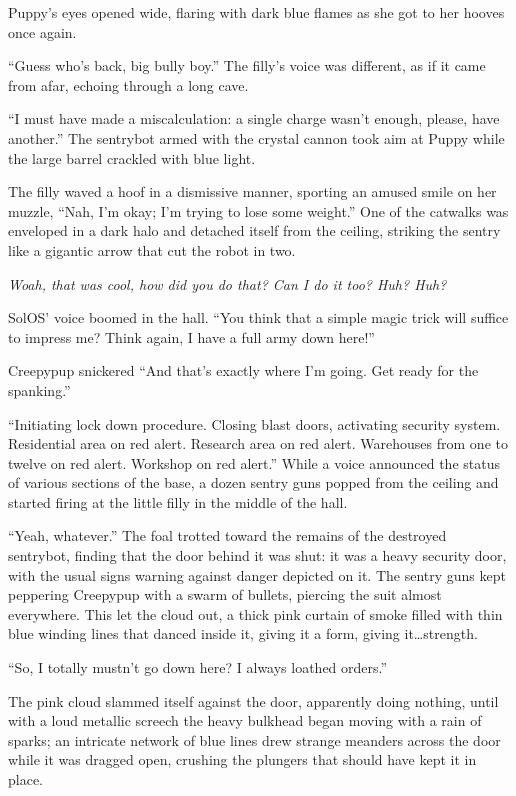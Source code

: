 
Puppy's eyes opened wide, flaring with dark blue flames as she got to her hooves once again.

``Guess who's back, big bully boy.'' The filly's voice was different, as if it came from afar, echoing through a long cave.

``I must have made a miscalculation: a single charge wasn't enough, please, have another.'' The sentrybot armed with the crystal cannon took aim at Puppy while the large barrel crackled with blue light.

The filly waved a hoof in a dismissive manner, sporting an amused smile on her muzzle, ``Nah, I'm okay; I'm trying to lose some weight.'' One of the catwalks was enveloped in a dark halo and detached itself from the ceiling, striking the sentry like a gigantic arrow that cut the robot in two.

\emph{Woah, that was cool, how did you do that? Can I do it too? Huh? Huh?}

SolOS' voice boomed in the hall. ``You think that a simple magic trick will suffice to impress me? Think again, I have a full army down here!''

Creepypup snickered ``And that's exactly where I'm going. Get ready for the spanking.''

``{\mt Initiating lock down procedure. Closing blast doors, activating security system. Residential area on red alert. Research area on red alert. Warehouses from one to twelve on red alert. Workshop on red alert.}'' While a voice announced the status of various sections of the base, a dozen sentry guns popped from the ceiling and started firing at the little filly in the middle of the hall.

``Yeah, whatever.'' The foal trotted toward the remains of the destroyed sentrybot, finding that the door behind it was shut: it was a heavy security door, with the usual signs warning against danger depicted on it. The sentry guns kept peppering Creepypup with a swarm of bullets, piercing the suit almost everywhere. This let the cloud out, a thick pink curtain of smoke filled with thin blue winding lines that danced inside it, giving it a form, giving it\dots strength.

``So, I totally mustn't go down here? I always loathed orders.''

The pink cloud slammed itself against the door, apparently doing nothing, until with a loud metallic screech the heavy bulkhead began moving with a rain of sparks; an intricate network of blue lines drew strange meanders across the door while it was dragged open, crushing the plungers that should have kept it in place.

